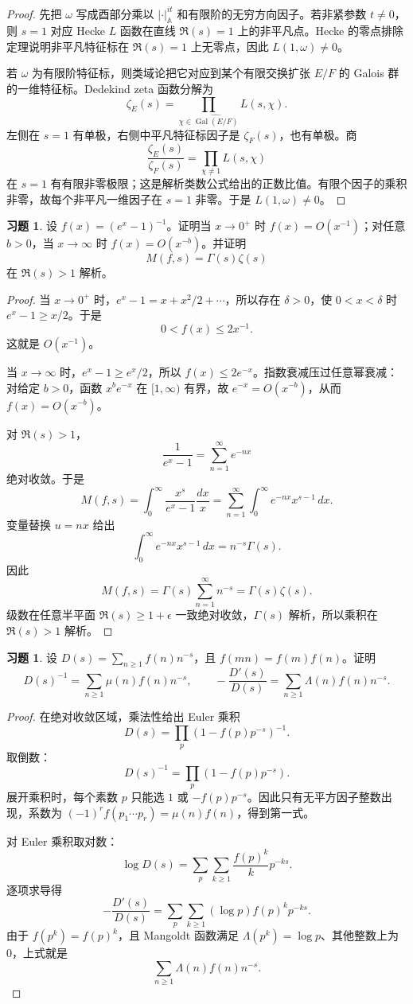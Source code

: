 \documentclass[11pt,a4paper,openany]{ctexbook}
\numberwithin{equation}{chapter}
\newcommand{\A}{\mathbb{A}}
\newcommand{\Gal}{\operatorname{Gal}}
\theoremstyle{plain}
\theoremstyle{definition}
\newtheorem{exercise}[theorem]{习题}
\theoremstyle{remark}
\begin{document}
\begin{proof}
先把 $\omega$ 写成酉部分乘以 $|\cdot|_{\A}^{it}$ 和有限阶的无穷方向因子。若非紧参数 $t\ne0$，则 $s=1$ 对应 Hecke $L$ 函数在直线 $\Re(s)=1$ 上的非平凡点。Hecke 的零点排除定理说明非平凡特征标在 $\Re(s)=1$ 上无零点，因此 $L(1,\omega)\ne0$。

若 $\omega$ 为有限阶特征标，则类域论把它对应到某个有限交换扩张 $E/F$ 的 Galois 群的一维特征标。Dedekind zeta 函数分解为
\[
  \zeta_E(s)=\prod_{\chi\in\widehat{\Gal(E/F)}}L(s,\chi).
\]
左侧在 $s=1$ 有单极，右侧中平凡特征标因子是 $\zeta_F(s)$，也有单极。商
\[
  \frac{\zeta_E(s)}{\zeta_F(s)}
  =
  \prod_{\chi\ne1}L(s,\chi)
\]
在 $s=1$ 有有限非零极限；这是解析类数公式给出的正数比值。有限个因子的乘积非零，故每个非平凡一维因子在 $s=1$ 非零。于是 $L(1,\omega)\ne0$。
\end{proof}

\begin{exercise}
设 $f(x)=(e^x-1)^{-1}$。证明当 $x\to0^+$ 时 $f(x)=O(x^{-1})$；对任意 $b>0$，当 $x\to\infty$ 时 $f(x)=O(x^{-b})$。并证明
\[
  M(f,s)=\Gamma(s)\zeta(s)
\]
在 $\Re(s)>1$ 解析。
\end{exercise}

\begin{proof}
当 $x\to0^+$ 时，$e^x-1=x+x^2/2+\cdots$，所以存在 $\delta>0$，使 $0<x<\delta$ 时 $e^x-1\ge x/2$。于是
\[
  0<f(x)\le 2x^{-1}.
\]
这就是 $O(x^{-1})$。

当 $x\to\infty$ 时，$e^x-1\ge e^x/2$，所以 $f(x)\le2e^{-x}$。指数衰减压过任意幂衰减：对给定 $b>0$，函数 $x^be^{-x}$ 在 $[1,\infty)$ 有界，故 $e^{-x}=O(x^{-b})$，从而 $f(x)=O(x^{-b})$。

对 $\Re(s)>1$，
\[
  \frac1{e^x-1}=\sum_{n=1}^{\infty}e^{-nx}
\]
绝对收敛。于是
\[
  M(f,s)=\int_0^\infty \frac{x^s}{e^x-1}\frac{dx}{x}
  =
  \sum_{n=1}^{\infty}\int_0^\infty e^{-nx}x^{s-1}\,dx.
\]
变量替换 $u=nx$ 给出
\[
  \int_0^\infty e^{-nx}x^{s-1}\,dx=n^{-s}\Gamma(s).
\]
因此
\[
  M(f,s)=\Gamma(s)\sum_{n=1}^{\infty}n^{-s}=\Gamma(s)\zeta(s).
\]
级数在任意半平面 $\Re(s)\ge1+\epsilon$ 一致绝对收敛，$\Gamma(s)$ 解析，所以乘积在 $\Re(s)>1$ 解析。
\end{proof}

\begin{exercise}
设 $D(s)=\sum_{n\ge1}f(n)n^{-s}$，且 $f(mn)=f(m)f(n)$。证明
\[
  D(s)^{-1}=\sum_{n\ge1}\mu(n)f(n)n^{-s},
\qquad
  -\frac{D'(s)}{D(s)}=\sum_{n\ge1}\Lambda(n)f(n)n^{-s}.
\]
\end{exercise}

\begin{proof}
在绝对收敛区域，乘法性给出 Euler 乘积
\[
  D(s)=\prod_p(1-f(p)p^{-s})^{-1}.
\]
取倒数：
\[
  D(s)^{-1}=\prod_p(1-f(p)p^{-s}).
\]
展开乘积时，每个素数 $p$ 只能选 $1$ 或 $-f(p)p^{-s}$。因此只有无平方因子整数出现，系数为 $(-1)^r f(p_1\cdots p_r)=\mu(n)f(n)$，得到第一式。

对 Euler 乘积取对数：
\[
  \log D(s)=
  \sum_p\sum_{k\ge1}\frac{f(p)^k}{k}p^{-ks}.
\]
逐项求导得
\[
  -\frac{D'(s)}{D(s)}
  =
  \sum_p\sum_{k\ge1}(\log p)f(p)^k p^{-ks}.
\]
由于 $f(p^k)=f(p)^k$，且 Mangoldt 函数满足 $\Lambda(p^k)=\log p$、其他整数上为 $0$，上式就是
\[
  \sum_{n\ge1}\Lambda(n)f(n)n^{-s}.
\]
\end{proof}
\end{document}
